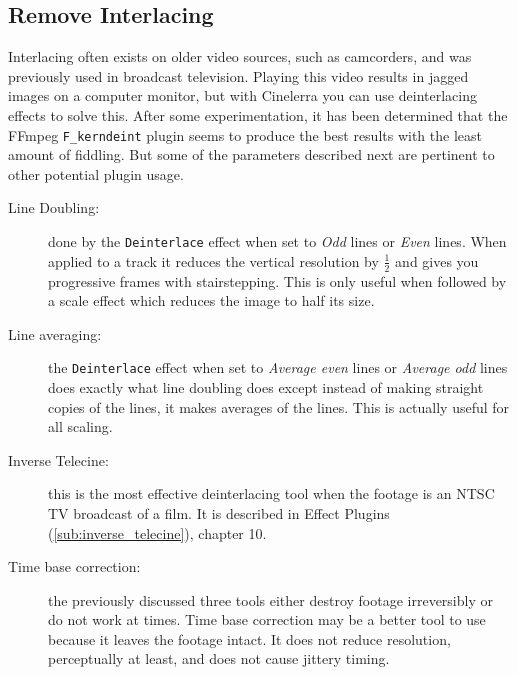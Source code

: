 \subsection{Remove Interlacing}%
\label{sub:remove_interlacing}

Interlacing often exists on older video sources, such as camcorders, and was previously used in broadcast television. Playing this video results in jagged images on a computer monitor, but with Cinelerra you can use deinterlacing effects to solve this.  After some experimentation, it has been determined that the FFmpeg \texttt{F\_kerndeint} plugin seems to produce the best results with the least amount of fiddling.  But some of the parameters described next are pertinent to other potential plugin usage.

\begin{description}
	\item[Line Doubling:] done by the \texttt{Deinterlace} effect when set to \textit{Odd} lines or \textit{Even} lines.  When applied to a track it reduces the vertical resolution by $\frac{1}{2}$ and gives you progressive frames with stairstepping. This is only useful when followed by a scale effect which reduces the image to half its size.
	\item[Line averaging:] the \texttt{Deinterlace} effect when set to \textit{Average even} lines or \textit{Average odd} lines does exactly what line doubling does except instead of making straight copies of the lines, it makes averages of the lines. This is actually useful for all scaling.
	\item[Inverse Telecine:] this is the most effective deinterlacing tool when the footage is an NTSC TV broadcast of a film. It is described in Effect Plugins (\ref{sub:inverse_telecine}), chapter 10.
	\item[Time base correction:] the previously discussed three tools either destroy footage irreversibly or do not work at times. Time base correction may be a better tool to use because it leaves the footage intact. It does not reduce resolution, perceptually at least, and does not cause jittery timing.

\end{description}
